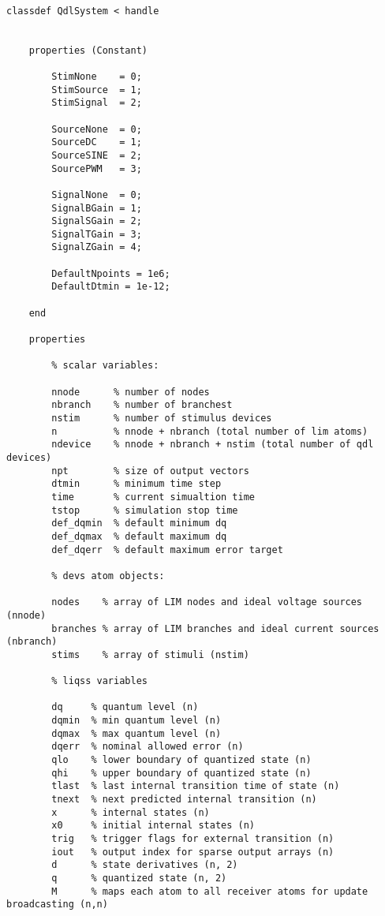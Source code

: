 

\begin{lstlisting}
 
classdef QdlSystem < handle  
    
    
    properties (Constant)
        
        StimNone    = 0;
        StimSource  = 1;
        StimSignal  = 2;
        
        SourceNone  = 0;
        SourceDC    = 1;
        SourceSINE  = 2;
        SourcePWM   = 3;
        
        SignalNone  = 0;
        SignalBGain = 1;
        SignalSGain = 2;
        SignalTGain = 3;
        SignalZGain = 4; 
        
        DefaultNpoints = 1e6;
        DefaultDtmin = 1e-12;
        
    end
   
    properties
        
        % scalar variables:
        
        nnode      % number of nodes
        nbranch    % number of branchest 
        nstim      % number of stimulus devices
        n          % nnode + nbranch (total number of lim atoms)
        ndevice    % nnode + nbranch + nstim (total number of qdl devices) 
        npt        % size of output vectors
        dtmin      % minimum time step
        time       % current simualtion time
        tstop      % simulation stop time
        def_dqmin  % default minimum dq
        def_dqmax  % default maximum dq
        def_dqerr  % default maximum error target
        
        % devs atom objects:
        
        nodes    % array of LIM nodes and ideal voltage sources (nnode)
        branches % array of LIM branches and ideal current sources (nbranch)
        stims    % array of stimuli (nstim)

        % liqss variables 
        
        dq     % quantum level (n)
        dqmin  % min quantum level (n)
        dqmax  % max quantum level (n)
        dqerr  % nominal allowed error (n)
        qlo    % lower boundary of quantized state (n)
        qhi    % upper boundary of quantized state (n)
        tlast  % last internal transition time of state (n)
        tnext  % next predicted internal transition (n)
        x      % internal states (n)
        x0     % initial internal states (n)
        trig   % trigger flags for external transition (n)
        iout   % output index for sparse output arrays (n)
        d      % state derivatives (n, 2)
        q      % quantized state (n, 2)
        M      % maps each atom to all receiver atoms for update broadcasting (n,n)


\end{lstlisting}
